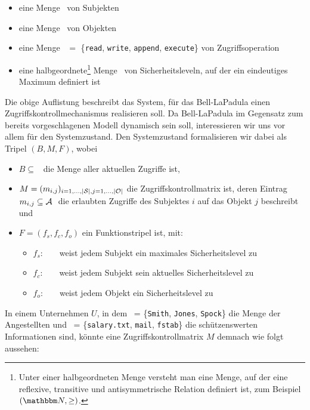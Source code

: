 \begin{itemize}
	\item eine Menge \calS\ von Subjekten 
	\item eine Menge \calO\ von Objekten
	\item eine Menge \calA\ \(=\) \{\texttt{read}, \texttt{write}, \texttt{append}, \texttt{execute}\} von Zugriffsoperation
	\item eine halbgeordnete\footnote{Unter einer halbgeordneten Menge versteht man eine Menge, auf der eine reflexive, transitive und antisymmetrische Relation definiert ist, zum Beispiel \((\N, \geq)\).} Menge \calL\ von Sicherheitsleveln, auf der ein eindeutiges Maximum definiert ist %
\end{itemize}

Die obige Auflistung beschreibt das System, für das Bell-LaPadula einen Zugriffskontrollmechanismus realisieren soll. Da Bell-LaPadula im Gegensatz zum bereits vorgeschlagenen Modell dynamisch sein soll, interessieren wir uns vor allem für den Systemzustand. Den Systemzustand formalisieren wir dabei als Tripel \((B,M,F)\), wobei

\begin{itemize}
	\item \(B \subseteq\) \calS \ctsProd \calO \ctsProd \calA\  die Menge aller aktuellen Zugriffe ist,
	\item \(M = (m_{i, j})_{i = 1,...,\vert \mathcal{S} \vert, j = 1,...,\vert \mathcal{O} \vert}\) die Zugriffskontrollmatrix ist, deren Eintrag \begin{math} m_{i, j} \subseteq \calA\ \end{math} die erlaubten Zugriffe des Subjektes \(i\) auf das Objekt \(j\) beschreibt und
	\item \(F = (f_s, f_c, f_o)\) ein Funktionstripel ist, mit:
	\begin{itemize}
		\item \(f_s:\) \calS\ \rArrow\ \calL\ weist jedem Subjekt ein maximales Sicherheitslevel zu
		\item \(f_c:\) \calS\ \rArrow\ \calL\ weist jedem Subjekt sein aktuelles Sicherheitslevel zu 
		\item \(f_o:\) \calO\ \rArrow\ \calL\ weist jedem Objekt ein Sicherheitslevel zu
	\end{itemize}
\end{itemize}
 
In einem Unternehmen \(U\), in dem \calS\ = \{\texttt{Smith}, \texttt{Jones}, \texttt{Spock}\} die Menge der Angestellten
und \calO\ = \{\texttt{salary.txt}, \texttt{mail}, \texttt{fstab}\} die schützenswerten Informationen sind, könnte
eine Zugriffskontrollmatrix \(M\) demnach wie folgt aussehen:

